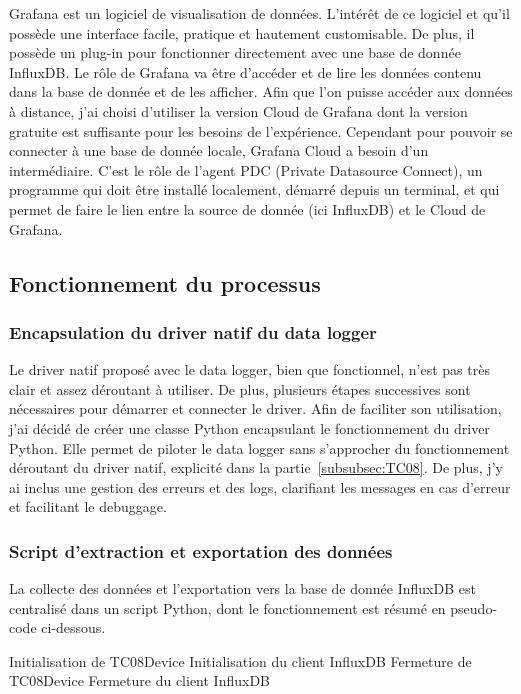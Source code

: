 \documentclass[12pt, a4paper]{article}
\begin{document}
Grafana est un logiciel de visualisation de données. L'intérêt de ce logiciel et qu'il possède une interface facile, pratique et hautement customisable. De plus, il possède un plug-in pour fonctionner directement avec une base de donnée InfluxDB. Le rôle de Grafana va être d'accéder et de lire les données contenu dans la base de donnée et de les afficher. Afin que l'on puisse accéder aux données à distance, j'ai choisi d'utiliser la version Cloud de Grafana dont la version gratuite est suffisante pour les besoins de l'expérience. Cependant pour pouvoir se connecter à une base de donnée locale, Grafana Cloud a besoin d'un intermédiaire. C'est le rôle de l'agent PDC (Private Datasource Connect), un programme qui doit être installé localement, démarré depuis un terminal, et qui permet de faire le lien entre la source de donnée (ici InfluxDB) et le Cloud de Grafana. 

\subsection{Fonctionnement du processus}

\subsubsection{Encapsulation du driver natif du data logger}

Le driver natif proposé avec le data logger, bien que fonctionnel, n'est pas très clair et assez déroutant à utiliser. De plus, plusieurs étapes successives sont nécessaires pour démarrer et connecter le driver. Afin de faciliter son utilisation, j'ai décidé de créer une classe Python encapsulant le fonctionnement du driver Python. Elle permet de piloter le data logger sans s'approcher du fonctionnement déroutant du driver natif, explicité dans la partie~\ref{subsubsec:TC08}. De plus, j'y ai inclus une gestion des erreurs et des logs, clarifiant les messages en cas d'erreur et facilitant le debuggage.

\subsubsection{Script d'extraction et exportation des données}

La collecte des données et l'exportation vers la base de donnée InfluxDB est centralisé dans un script Python, dont le fonctionnement est résumé en pseudo-code ci-dessous.

\begin{algorithm}[ht]
  \DontPrintSemicolon\SetAlgoLined
  Initialisation de TC08Device\;
  Initialisation du client InfluxDB\;
  Fermeture de TC08Device\;
  Fermeture du client InfluxDB\;
  \caption{Main.py}
\end{algorithm}
\end{document}
